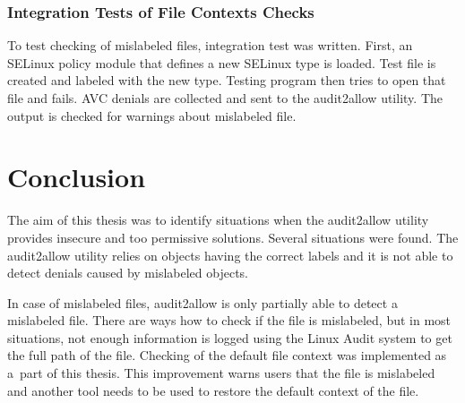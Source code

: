 \subsection{Integration Tests of File Contexts Checks}
To test checking of mislabeled files, integration test was written. First,
an SELinux policy module that defines a new SELinux type is loaded. Test file is
created and labeled with the new type. Testing program then tries to open that
file and fails. AVC denials are collected and sent to the audit2allow utility.
The output is checked for warnings about mislabeled file.

\chapter{Conclusion}


The aim of this thesis was to identify situations when the audit2allow utility
provides insecure and too permissive solutions. Several situations were found.
The audit2allow utility relies on objects having the correct labels and it is
not able to detect denials caused by mislabeled objects.

In case of mislabeled files, audit2allow is only partially able to detect a
mislabeled file. There are ways how to check if the file is mislabeled, but in
most situations, not enough information is logged using the Linux Audit system
to get the full path of the file. Checking of the default file context was
implemented as a~part of this thesis. This improvement warns users that the file
is mislabeled and another tool needs to be used to restore the default context
of the file.

